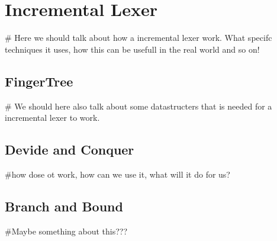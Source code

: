 \chapter{Incremental Lexer}
\# Here we should talk about how a incremental lexer work. What specifc
techniques it uses, how this can be usefull in the real world and so on!

\section{FingerTree}
\# We should here also talk about some datastructers that is needed for a
incremental lexer to work. 

\section{Devide and Conquer}
\#how dose ot work, how can we use it, what will it do for us?

\section{Branch and Bound}
\#Maybe something about this???
